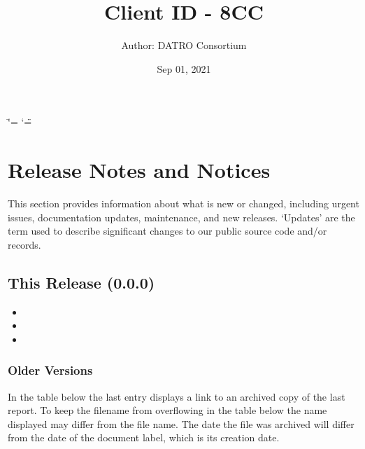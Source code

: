 \documentclass[letterpaper,10pt,openany,oneside,english]{sphinxmanual}
\title{Client ID - 8CC}
\date{Sep 01, 2021}
\author{Author: DATRO Consortium}
\begin{document}
\ifdefined\shorthandoff
  \ifnum\catcode`\=\string=\active\shorthandoff{=}\fi
  \ifnum\catcode`\"=\active{}\fi
\fi

\pagestyle{empty}
\sphinxmaketitle
\pagestyle{plain}
\sphinxtableofcontents
\pagestyle{normal}
\label{\detokenize{index::doc}}



\chapter{Release Notes and Notices}
\label{\detokenize{releasenotes:release-notes-and-notices}}\label{\detokenize{releasenotes::doc}}
\sphinxAtStartPar
This section provides information about what is new or changed, including urgent issues, documentation updates, maintenance, and new releases.
\sphinxhyphen{} ‘Updates’ are the term used to describe significant changes to our public source code and/or records.


\section{This Release (0.0.0)}
\label{\detokenize{releasenotes:this-release-0-0-0}}\begin{itemize}
\item {} 
\sphinxAtStartPar
{} \sphinxhyphen{} 

\item {} 
\sphinxAtStartPar
{} \sphinxhyphen{} 

\item {} 
\sphinxAtStartPar
{} \sphinxhyphen{} 

\end{itemize}


\subsection{Older Versions}
\label{\detokenize{releasenotes:older-versions}}
\sphinxAtStartPar
In the table below the last entry displays a link to an archived copy of the last report.
To keep the filename from overflowing in the table below the name displayed may differ from the file name.
The date the file was archived will differ from the date of the document label, which is its creation date.
\end{document}
